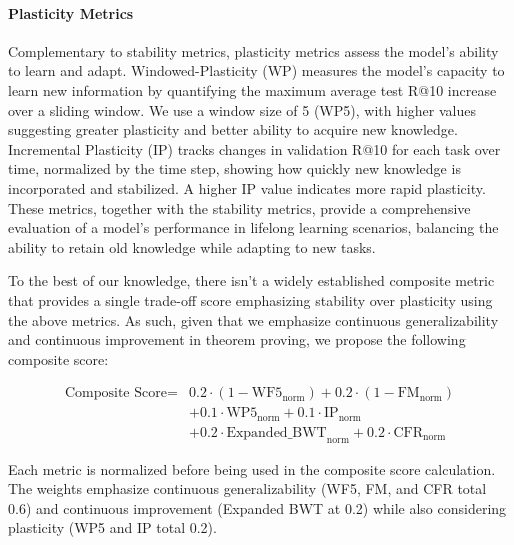 \documentclass{article} %
\begin{document}
\paragraph{Plasticity Metrics}
Complementary to stability metrics, plasticity metrics assess the model's ability to learn and adapt. Windowed-Plasticity (WP) measures the model's capacity to learn new information by quantifying the maximum average test R@10 increase over a sliding window. We use a window size of 5 (WP5), with higher values suggesting greater plasticity and better ability to acquire new knowledge. Incremental Plasticity (IP) tracks changes in validation R@10 for each task over time, normalized by the time step, showing how quickly new knowledge is incorporated and stabilized. A higher IP value indicates more rapid plasticity. These metrics, together with the stability metrics, provide a comprehensive evaluation of a model's performance in lifelong learning scenarios, balancing the ability to retain old knowledge while adapting to new tasks.

To the best of our knowledge, there isn't a widely established composite metric that provides a single trade-off score emphasizing stability over plasticity using the above metrics. As such, given that we emphasize continuous generalizability and continuous improvement in theorem proving, we propose the following composite score:

\begin{align*}
\text{Composite Score} = & 0.2 \cdot (1 - \text{WF5}_\text{norm}) + 0.2 \cdot (1 - \text{FM}_\text{norm}) \\
                         & + 0.1 \cdot \text{WP5}_\text{norm} + 0.1 \cdot \text{IP}_\text{norm} \\
                         & + 0.2 \cdot \text{Expanded\_BWT}_\text{norm} + 0.2 \cdot \text{CFR}_\text{norm}
\end{align*}

Each metric is normalized before being used in the composite score calculation. The weights emphasize continuous generalizability (WF5, FM, and CFR total 0.6) and continuous improvement (Expanded BWT at 0.2) while also considering plasticity (WP5 and IP total 0.2).

\end{document}
